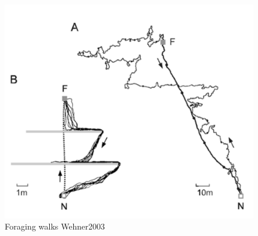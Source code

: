 \documentclass[ignorenonframetext]{beamer}
\begin{document}
\begin{frame}
{\begin{itemize}
\end{itemize}
 \begin{figure}[H]
 \centering
 \includegraphics[scale=0.6]{./Pics/WhatAbout.png} 
 \caption{Foraging walks Wehner2003} \label{fig:Variancea}
 \end{figure} 
\begin{center} 
\end{center} 
}









\end{frame}
\end{document}
